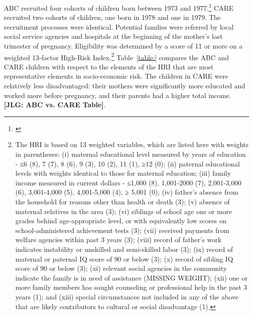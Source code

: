 \noindent ABC recruited four cohorts of children born between 1973 and 1977.\footnote{\citet{Feagans_1996_Childrens-Talk}} CARE recruited two cohorts of children, one  born in 1978 and one in 1979. The recruitment processes were identical. Potential families were referred by local social service agencies and hospitals at the beginning of the mother's last trimester of pregnancy. Eligibility was determined by a score of 11 or more on a weighted 13-factor High-Risk Index.\footnote{The HRI is based on 13 weighted variables, which are listed here with weights in parentheses: (i) maternal educational level measured by years of education - ≤6 (8), 7 (7), 8 (6), 9 (3), 10 (2), 11 (1), ≥12 (0); (ii) paternal educational levels with weights identical to those for maternal education; (iii) family income measured in current dollars - ≤1,000 (8), 1,001-2000 (7), 2,001-3,000 (6), 3,001-4,000 (5), 4,001-5,000 (4), ≥ 5,001 (0); (iv) father’s absence from the household for reasons other than health or death (3); (v) absence of maternal relatives in the area (3); (vi) siblings of school age one or more grades behind age-appropriate level, or with equivalently low scores on school-administered achievement tests (3); (vii) received payments from welfare agencies within past 3 years (3); (viii) record of father’s work indicates instability or unskilled and semi-skilled labor (3); (ix) record of maternal or paternal IQ score of 90 or below (3); (x) record of sibling IQ score of 90 or below (3); (xi) relevant social agencies in the community indicate the family is in need of assistance (MISSING WEIGHT); (xii) one or more family members has sought counseling or professional help in the past 3 years (1); and (xiii) special circumstances not included in any of the above that are likely contributors to cultural or social disadvantage (1).} Table~\ref{table:} compares the ABC and CARE children with respect to the elements of the HRI that are most representative elements in socio-economic risk. The children in CARE were relatively less disadvantaged: their mothers were significantly more educated and worked more before pregnancy, and their parents had a higher total income.\\

\noindent \textbf{[JLG: ABC vs. CARE Table]}.\\

